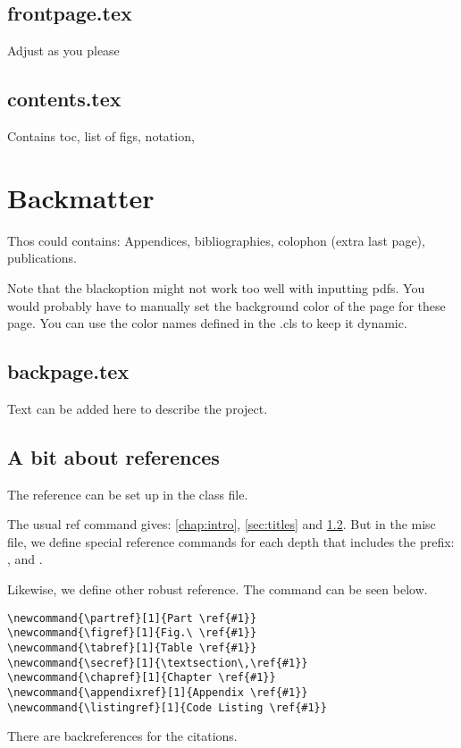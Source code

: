\subsection{frontpage.tex} \label{frontpage}
Adjust as you please

\subsection{contents.tex}
Contains toc, list of figs, notation, 

\section{Backmatter}
Thos could contains: Appendices, bibliographies, colophon (extra last page), publications.

Note that the blackoption might not work too well with inputting pdfs. You would probably have to manually set the background color of the page for these page. You can use the color names defined in the .cls to keep it dynamic.


\subsection{backpage.tex} \label{backpage}
Text can be added here to describe the project.



\subsection{A bit about references} \label{ssec:refs}
The reference can be set up in the class file.

The usual ref command gives: \ref{chap:intro}, \ref{sec:titles} and  \ref{ssec:refs}. But in the misc file, we define special reference commands for each depth that includes the prefix: ,  and  .

Likewise, we define other robust reference. The command can be seen below.
\begin{lstlisting}
\newcommand{\partref}[1]{Part \ref{#1}}
\newcommand{\figref}[1]{Fig.\ \ref{#1}}
\newcommand{\tabref}[1]{Table \ref{#1}}
\newcommand{\secref}[1]{\textsection\,\ref{#1}}
\newcommand{\chapref}[1]{Chapter \ref{#1}}
\newcommand{\appendixref}[1]{Appendix \ref{#1}}
\newcommand{\listingref}[1]{Code Listing \ref{#1}}
\end{lstlisting}

There are backreferences for the citations.



